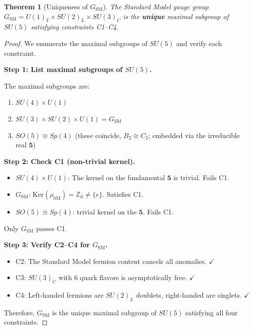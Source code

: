 \documentclass[11pt,a4paper,openright]{book}
\theoremstyle{plain}
\newtheorem{theorem}{Theorem}[chapter]
\theoremstyle{definition}
\newcommand{\SM}{\mathrm{SM}}
\newcommand{\Ker}{\mathrm{Ker}}
\newcommand{\Z}{\mathbb{Z}}
\begin{document}
\begin{theorem}[Uniqueness of $G_{\SM}$]
\label{thm:uniqueness-ch2}
The Standard Model gauge group $G_{\SM} = U(1)_Y \times SU(2)_L \times SU(3)_C$ is the \textbf{unique} maximal subgroup of $SU(5)$ satisfying constraints C1--C4.
\end{theorem}

\begin{proof}
We enumerate the maximal subgroups of $SU(5)$ and verify each constraint.

\textbf{Step 1: List maximal subgroups of $SU(5)$.}

The maximal subgroups are:
\begin{enumerate}[label=(\alph*)]
    \item $SU(4) \times U(1)$
    \item $SU(3) \times SU(2) \times U(1) = G_{\SM}$
    \item $SO(5) \cong Sp(4)$ (these coincide, $B_2 \cong C_2$; embedded via the irreducible real $\mathbf{5}$)
\end{enumerate}

\textbf{Step 2: Check C1 (non-trivial kernel).}

\begin{itemize}
    \item $SU(4) \times U(1)$: The kernel on the fundamental $\mathbf{5}$ is trivial. Fails C1.
    \item $G_{\SM}$: $\Ker(\rho_{\SM}) = \Z_6 \neq \{e\}$. Satisfies C1.
    \item $SO(5) \cong Sp(4)$: trivial kernel on the $\mathbf{5}$. Fails C1.
\end{itemize}

Only $G_{\SM}$ passes C1.

\textbf{Step 3: Verify C2--C4 for $G_{\SM}$.}

\begin{itemize}
    \item C2: The Standard Model fermion content cancels all anomalies. $\checkmark$
    \item C3: $SU(3)_C$ with 6 quark flavors is asymptotically free. $\checkmark$
    \item C4: Left-handed fermions are $SU(2)_L$ doublets, right-handed are singlets. $\checkmark$
\end{itemize}

Therefore, $G_{\SM}$ is the unique maximal subgroup of $SU(5)$ satisfying all four constraints.
\end{proof}
\end{document}
